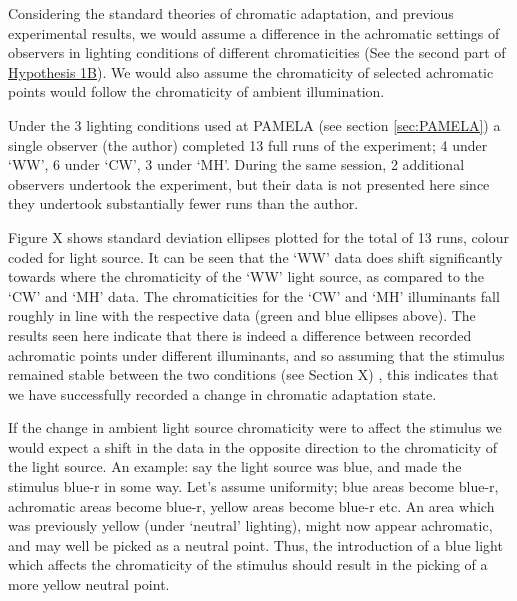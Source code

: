 Considering the standard theories of chromatic adaptation, and previous experimental results, we would assume a difference in the achromatic settings of observers in lighting conditions of different chromaticities (See the second part of \hyperref[list:hyp1b]{Hypothesis 1B}). We would also assume the chromaticity of selected achromatic points would follow the chromaticity of ambient illumination.

Under the 3 lighting conditions used at \gls{PAMELA} (see section \ref{sec:PAMELA}) a single observer (the author) completed 13 full runs of the experiment; 4 under `WW', 6 under `CW', 3 under `MH'. During the same session, 2 additional observers undertook the experiment, but their data is not presented here since they undertook substantially fewer runs than the author. 

Figure X %
shows standard deviation ellipses plotted for the total of 13 runs, colour coded for light source. It can be seen that the `WW' data does shift significantly towards where the chromaticity of the `WW' light source, as compared to the `CW' and `MH' data. The chromaticities for the `CW' and `MH' illuminants fall roughly in line with the respective data (green and blue ellipses above).
The results seen here indicate that there is indeed a difference between recorded achromatic points under different illuminants, and so assuming that the stimulus remained stable between the two conditions (see Section X) %
, this indicates that we have successfully recorded a change in chromatic adaptation state. 

If the change in ambient light source chromaticity were to affect the stimulus we would expect a shift in the data in the opposite direction to the chromaticity of the light source. An example: say the light source was blue, and made the stimulus blue-r in some way. Let's assume uniformity; blue areas become blue-r, achromatic areas become blue-r, yellow areas become blue-r etc. An area which was previously yellow (under `neutral' lighting), might now appear achromatic, and may well be picked as a neutral point. Thus, the introduction of a blue light which affects the chromaticity of the stimulus should result in the picking of a more yellow neutral point.

